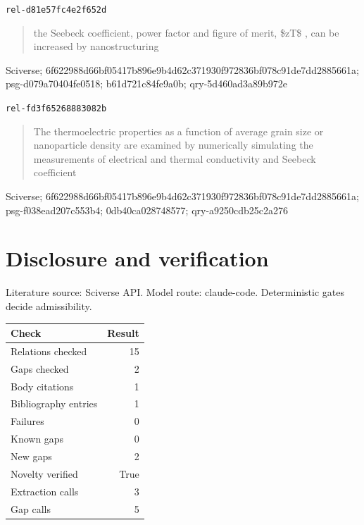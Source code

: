 \documentclass[11pt,a4paper]{article}
\begin{document}
\noindent\texttt{rel-d81e57fc4e2f652d} \cite{LimitationsOfZtAsAFigure201962331153}
\begin{quote}the Seebeck coefficient, power factor and figure of merit, \$zT\$ , can be increased by nanostructuring\end{quote}
{\small Sciverse; 6f622988d66bf05417b896e9b4d62c371930f972836bf078c91de7dd2885661a; psg-d079a70404fe0518; b61d721c84fe9a0b; qry-5d460ad3a89b972e}

\noindent\texttt{rel-fd3f65268883082b} \cite{LimitationsOfZtAsAFigure201962331153}
\begin{quote}The thermoelectric properties as a function of average grain size or nanoparticle density are examined by numerically simulating the measurements of electrical and thermal conductivity and Seebeck coefficient\end{quote}
{\small Sciverse; 6f622988d66bf05417b896e9b4d62c371930f972836bf078c91de7dd2885661a; psg-f038ead207c553b4; 0db40ca028748577; qry-a9250cdb25c2a276}

\section{Disclosure and verification}
Literature source: Sciverse API. Model route: claude-code. Deterministic gates decide admissibility.

\begin{tabular}{lr}
\toprule
Check & Result \\
\midrule
Relations checked & 15 \\
Gaps checked & 2 \\
Body citations & 1 \\
Bibliography entries & 1 \\
Failures & 0 \\
Known gaps & 0 \\
New gaps & 2 \\
Novelty verified & True \\
Extraction calls & 3 \\
Gap calls & 5 \\
\bottomrule
\end{tabular}



\end{document}
